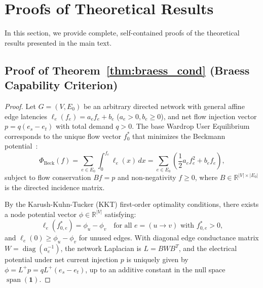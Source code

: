 \documentclass[11pt,a4paper]{article}
\begin{document}
\clearpage
\appendix

\section{Proofs of Theoretical Results}
\label{sec:appendix_proofs}

In this section, we provide complete, self-contained proofs of the theoretical results presented in the main text.

\subsection{Proof of Theorem~\ref{thm:braess_cond} (Braess Capability Criterion)}
\label{subsec:proof_thm1}

\begin{proof}
Let $G = (V, E_0)$ be an arbitrary directed network with general affine edge latencies $\ell_e(f_e) = a_e f_e + b_e$ ($a_e > 0, b_e \ge 0$), and net flow injection vector $p = q (e_s - e_t)$ with total demand $q > 0$. The base Wardrop User Equilibrium corresponds to the unique flow vector $f_0^*$ that minimizes the Beckmann potential~\cite{beckmann1956studies}:
\begin{equation}
\Phi_{\text{Beck}}(f) = \sum_{e \in E_0} \int_0^{f_e} \ell_e(x) \, dx = \sum_{e \in E_0} \left( \frac{1}{2} a_e f_e^2 + b_e f_e \right),
\end{equation}
subject to flow conservation $B f = p$ and non-negativity $f \ge 0$, where $B \in \mathbb{R}^{|V| \times |E_0|}$ is the directed incidence matrix.

By the Karush-Kuhn-Tucker (KKT) first-order optimality conditions, there exists a node potential vector $\phi \in \mathbb{R}^{|V|}$ satisfying:
\begin{equation}
\ell_e(f_{0, e}^*) = \phi_u - \phi_v \quad \text{for all } e = (u \to v) \text{ with } f_{0, e}^* > 0,
\end{equation}
and $\ell_e(0) \ge \phi_u - \phi_v$ for unused edges. With diagonal edge conductance matrix $W = \operatorname{diag}(a_e^{-1})$, the network Laplacian is $L = B W B^T$, and the electrical potential under net current injection $p$ is uniquely given by $\phi = L^+ p = q L^+ (e_s - e_t)$, up to an additive constant in the null space $\operatorname{span}(\mathbf{1})$.


\end{proof}
\end{document}
